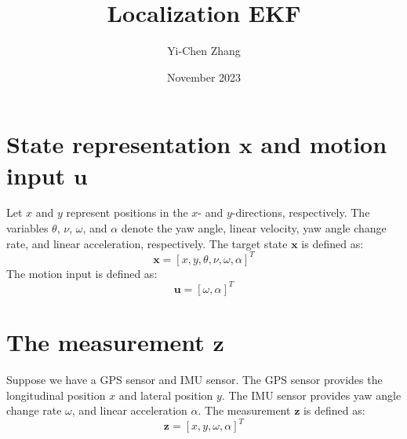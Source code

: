 \documentclass[12pt, a4paper]{article}
\title{Localization EKF}
\author{Yi-Chen Zhang}
\date{November 2023}
\begin{document}
\maketitle

\section{State representation $\bm{x}$ and motion input $\bm{u}$}
Let $x$ and $y$ represent positions in the $x$- and $y$-directions, respectively. The variables $\theta$, $\nu$, $\omega$, and $\alpha$ denote the yaw angle, linear velocity, yaw angle change rate, and linear acceleration, respectively. The target state $\bm{x}$ is defined as:
\[
  \bm{x} = [x, y, \theta, \nu, \omega, \alpha]^{T}
\]
The motion input is defined as:
\[
  \bm{u} = [\omega, \alpha]^{T}
\]

\section{The measurement $\bm{z}$}
Suppose we have a GPS sensor and IMU sensor. The GPS sensor provides the longitudinal position $x$ and lateral position $y$. The IMU sensor provides yaw angle change rate $\omega$, and linear acceleration $\alpha$. The measurement $\bm{z}$ is defined as:
\[
  \bm{z} = [x, y, \omega, \alpha]^{T}
\]
\end{document}
